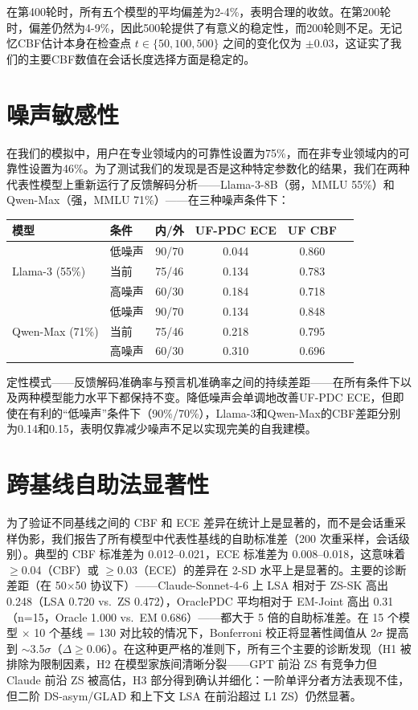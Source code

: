 \documentclass[11pt,a4paper,fontset=fandol]{ctexart}
\begin{document}
在第400轮时，所有五个模型的平均偏差为2-4\%，表明合理的收敛。在第200轮时，偏差仍然为4-9\%，因此500轮提供了有意义的稳定性，而200轮则不足。无记忆CBF估计本身在检查点 $t \in \{50, 100, 500\}$ 之间的变化仅为 $\pm 0.03$，这证实了我们的主要CBF数值在会话长度选择方面是稳定的。

\section{噪声敏感性}
\label{app:noise}

在我们的模拟中，用户在专业领域内的可靠性设置为75\%，而在非专业领域内的可靠性设置为46\%。为了测试我们的发现是否是这种特定参数化的结果，我们在两种代表性模型上重新运行了反馈解码分析——Llama-3-8B（弱，MMLU 55\%）和Qwen-Max（强，MMLU 71\%）——在三种噪声条件下：

\begin{center}
\small
\begin{tabular}{llcccc}
\toprule
\textbf{模型} & \textbf{条件} & \textbf{内/外} & \textbf{UF-PDC ECE} & \textbf{UF CBF} \\
\midrule
\multirow{3}{*}{Llama-3 (55\%)}
 & 低噪声    & 90/70 & 0.044 & 0.860 \\
 & 当前      & 75/46 & 0.134 & 0.783 \\
 & 高噪声   & 60/30 & 0.184 & 0.718 \\
\midrule
\multirow{3}{*}{Qwen-Max (71\%)}
 & 低噪声    & 90/70 & 0.134 & 0.848 \\
 & 当前      & 75/46 & 0.218 & 0.795 \\
 & 高噪声   & 60/30 & 0.310 & 0.696 \\
\bottomrule
\end{tabular}
\end{center}

定性模式——反馈解码准确率与预言机准确率之间的持续差距——在所有条件下以及两种模型能力水平下都保持不变。降低噪声会单调地改善UF-PDC ECE，但即使在有利的“低噪声”条件下（90\%/70\%），Llama-3和Qwen-Max的CBF差距分别为0.14和0.15，表明仅靠减少噪声不足以实现完美的自我建模。

\section{跨基线自助法显著性}
\label{app:cross_boot}

为了验证不同基线之间的 CBF 和 ECE 差异在统计上是显著的，而不是会话重采样伪影，我们报告了所有模型中代表性基线的自助标准差（200 次重采样，会话级别）。典型的 CBF 标准差为 0.012--0.021，ECE 标准差为 0.008--0.018，这意味着 $\geq$0.04（CBF）或 $\geq$0.03（ECE）的差异在 2-SD 水平上是显著的。主要的诊断差距（在 50$\times$50 协议下）——Claude-Sonnet-4-6 上 LSA 相对于 ZS-SK 高出 0.248（LSA 0.720 vs.\ ZS 0.472），OraclePDC 平均相对于 EM-Joint 高出 0.31（n=15，Oracle 1.000 vs.\ EM 0.686）——都大于 5 倍的自助标准差。在 15 个模型 $\times$ 10 个基线 = 130 对比较的情况下，Bonferroni 校正将显著性阈值从 $2\sigma$ 提高到 $\sim$3.5$\sigma$（$\Delta \geq 0.06$）。在这种更严格的准则下，所有三个主要的诊断发现（H1 被排除为限制因素，H2 在模型家族间清晰分裂——GPT 前沿 ZS 有竞争力但 Claude 前沿 ZS 被高估，H3 部分得到确认并细化：一阶单评分者方法表现不佳，但二阶 DS-asym/GLAD 和上下文 LSA 在前沿超过 L1 ZS）仍然显著。
\end{document}

